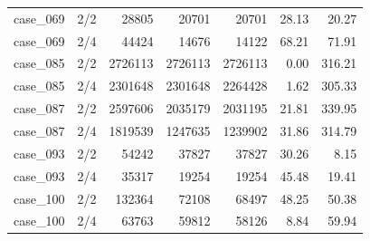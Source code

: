 \begin{tabular}{llrrrrr}
case\_069 & 2/2 & 28805 & 20701 & 20701 & 28.13 & 20.27 \\
case\_069 & 2/4 & 44424 & 14676 & 14122 & 68.21 & 71.91 \\
case\_085 & 2/2 & 2726113 & 2726113 & 2726113 & 0.00 & 316.21 \\
case\_085 & 2/4 & 2301648 & 2301648 & 2264428 & 1.62 & 305.33 \\
case\_087 & 2/2 & 2597606 & 2035179 & 2031195 & 21.81 & 339.95 \\
case\_087 & 2/4 & 1819539 & 1247635 & 1239902 & 31.86 & 314.79 \\
case\_093 & 2/2 & 54242 & 37827 & 37827 & 30.26 & 8.15 \\
case\_093 & 2/4 & 35317 & 19254 & 19254 & 45.48 & 19.41 \\
case\_100 & 2/2 & 132364 & 72108 & 68497 & 48.25 & 50.38 \\
case\_100 & 2/4 & 63763 & 59812 & 58126 & 8.84 & 59.94 \\
\bottomrule
\end{tabular}
